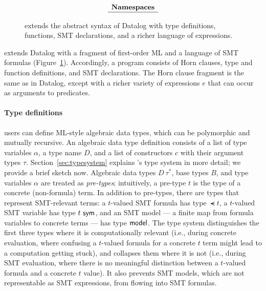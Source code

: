 \documentclass[acmsmall,screen,nonacm]{acmart}
\theoremstyle{definition}
\begin{document}
\begin{figure}[t]
\[\begin{array}{lrcl}
    \multicolumn{4}{l}{\textbf{Namespaces}} \\ \hline
    
  \end{array} \]
	

  \caption{\Name extends the abstract syntax of Datalog with type definitions,
  functions, SMT declarations, and a richer language of expressions.}
  \label{fig:grammar}
\end{figure}

\Name extends Datalog with a fragment of first-order ML and a language of SMT
formulas (Figure~\ref{fig:grammar}).
Accordingly, a program consists of Horn clauses, type and function definitions,
and SMT declarations.
The Horn clause fragment is the same as in Datalog, except with a richer
variety of expressions $e$ that can occur as arguments to predicates.

\paragraph{Type definitions}
\Name users can define ML-style algebraic data types, which can be
polymorphic and mutually recursive.
An algebraic data type definition consists of a list of type variables $\alpha$, a type
name $D$, and a list of constructors $c$ with their argument types $\tau$.
Section~\ref{sec:typesystem} explains \Name's type system in more detail; we
provide a brief sketch now.
Algebraic data types $D~\tau^*$, base types $B$, and type variables $\alpha$
are treated as {\em pre-types}; intuitively, a pre-type $t$ is the type of a
concrete (non-formula) term.
In addition to pre-types, there are types that represent SMT-relevant terms: a
$t$-valued SMT formula has type $\smt{t}$, a $t$-valued SMT variable has type
${t} ~ \mathsf{sym}$, and an SMT model --- a finite map from formula variables to concrete
terms --- has type $\mathsf{model}$.
%
The \Name type system distinguishes the first three types where it is
computationally relevant (i.e., during concrete evaluation, where
confusing a $t$-valued formula for a concrete $t$ term might lead to a
computation getting stuck), and collapses them where it is not (i.e.,
during SMT evaluation, where there is no meaningful distinction
between a $t$-valued formula and a concrete $t$ value).
It also prevents SMT models, which are not representable as SMT expressions,
from flowing into SMT formulas.
\end{document}
